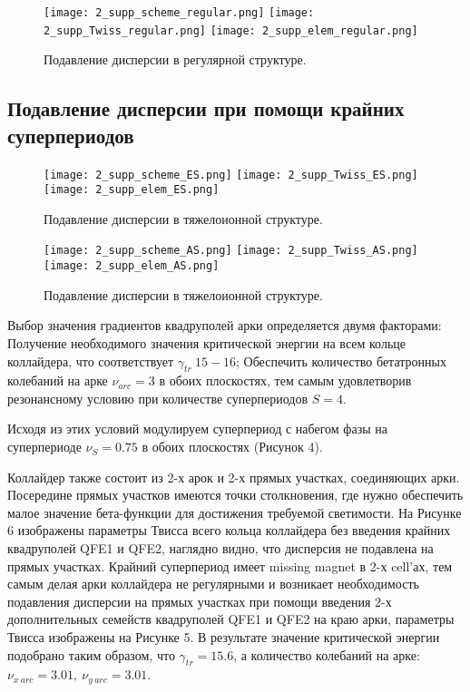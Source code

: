 \begin{figure} [h!]
   \center
   \texttt{[image: 2\_supp\_scheme\_regular.png]}
   \texttt{[image: 2\_supp\_Twiss\_regular.png]}
   \texttt{[image: 2\_supp\_elem\_regular.png]}
   \caption{Подавление дисперсии в регулярной структуре.}
   \label{fig:2_disp_supp_full_regular}
\end{figure}
	
\subsection{Подавление дисперсии при помощи крайних суперпериодов}\label{subsec:transition_variation/disp_supperssion/ES}

\par	
\begin{figure} [h!]
   \center
   \texttt{[image: 2\_supp\_scheme\_ES.png]}
   \texttt{[image: 2\_supp\_Twiss\_ES.png]}
   \texttt{[image: 2\_supp\_elem\_ES.png]}
   \caption{Подавление дисперсии в тяжелоионной структуре.}
   \label{fig:2_disp_supp_ES}
\end{figure}	

\begin{figure} [h!]
   \center
   \texttt{[image: 2\_supp\_scheme\_AS.png]}
   \texttt{[image: 2\_supp\_Twiss\_AS.png]}
   \texttt{[image: 2\_supp\_elem\_AS.png]}
   \caption{Подавление дисперсии в тяжелоионной структуре.}
   \label{fig:2_disp_supp_AS}
\end{figure}	

\par Выбор значения градиентов квадруполей арки определяется двумя факторами:
	Получение необходимого значения критической энергии на всем кольце коллайдера, что соответствует $\gamma_{tr}~15-16$;
	Обеспечить количество бетатронных колебаний на арке $\nu_{arc}=3$ в обоих плоскостях, тем самым удовлетворив резонансному условию при количестве суперпериодов $S=4$.
	
\par Исходя из этих условий модулируем суперпериод с набегом фазы на суперпериоде $\nu_S=0.75$ в обоих плоскостях (Рисунок 4).

\par Коллайдер также состоит из 2-х арок и 2-х прямых участках, соединяющих арки. Посередине прямых участков имеются точки столкновения, где нужно обеспечить малое значение бета-функции для достижения требуемой светимости. На Рисунке 6 изображены параметры Твисса всего кольца коллайдера без введения крайних квадруполей QFE1 и QFE2, наглядно видно, что дисперсия не подавлена на прямых участках. Крайний суперпериод имеет missing magnet в 2-х cell’ах, тем самым делая арки коллайдера не регулярными и возникает необходимость подавления дисперсии на прямых участках при помощи введения 2-х дополнительных семейств квадруполей QFE1 и QFE2 на краю арки, параметры Твисса изображены на Рисунке 5.
В результате значение критической энергии подобрано таким образом, что $\gamma_{tr}=15.6$, а количество колебаний на арке: $\nu_{x\ arc}=3.01,\ \nu_{y\ arc}=3.01$.


